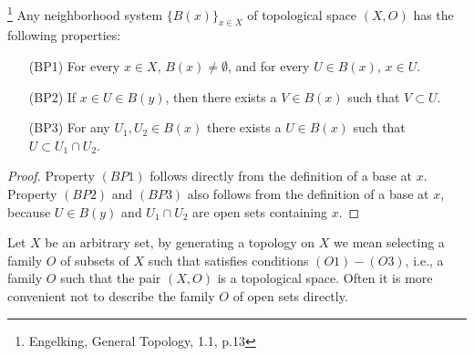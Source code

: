 \begin{proposition} \label{P:neigh_sys}
\footnote{Engelking, General Topology, 1.1, p.13}
Any neighborhood system $\{B(x)\}_{x\in X}$ of topological space $(X,O)$ has the
following properties:
\begin{enumerate}
  \item[(BP1)] For every $x\in X$, $B(x)\neq \emptyset$, and for every 
    $U\in B(x)$, $x\in U$.
  \item[(BP2)] If $x\in U\in B(y)$, then there exists a $V\in B(x)$ such that
    $V\subset U$.
  \item[(BP3)] For any $U_1,U_2\in B(x)$ there exists a $U\in B(x)$ such that
    $U\subset U_1\cap U_2$.
\end{enumerate}
\end{proposition}
\begin{proof}
Property $(BP1)$ follows directly from the definition of a base at $x$. Property
$(BP2)$ and $(BP3)$ also follows from the definition of a base at $x$, because
$U\in B(y)$ and $U_1\cap U_2$ are open sets containing $x$.
\end{proof}


Let $X$ be an arbitrary set, by generating a topology on $X$ we mean selecting a
family $O$ of subsets of $X$ such that satisfies conditions $(O1)-(O3)$, i.e., a
family $O$ such that the pair $(X,O)$ is a topological space. Often it is more
convenient not to describe the family $O$ of open sets directly.

